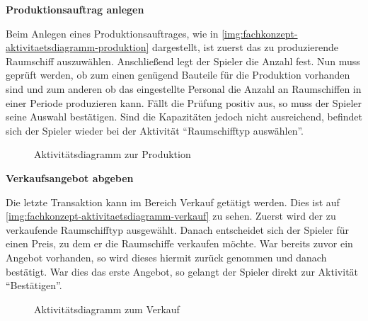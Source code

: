 \medskip

\textbf{Produktionsauftrag anlegen}

Beim Anlegen eines Produktionsauftrages, wie in \vref{img:fachkonzept-aktivitaetsdiagramm-produktion} dargestellt, ist zuerst das zu produzierende Raumschiff auszuwählen. Anschließend legt der Spieler die Anzahl fest. Nun muss geprüft werden, ob zum einen genügend Bauteile für die Produktion vorhanden sind und zum anderen ob das eingestellte Personal die Anzahl an Raumschiffen in einer Periode produzieren kann. Fällt die Prüfung positiv aus, so muss der Spieler seine Auswahl bestätigen. Sind die Kapazitäten jedoch nicht ausreichend, befindet sich der Spieler wieder bei der Aktivität “Raumschifftyp auswählen”.

\begin{figure}[htb]
  \centering
  \caption{Aktivitätsdiagramm zur Produktion}
  \label{img:fachkonzept-aktivitaetsdiagramm-produktion}
\end{figure}

\medskip

\textbf{Verkaufsangebot abgeben}

Die letzte Transaktion kann im Bereich Verkauf getätigt werden. Dies ist auf \vref{img:fachkonzept-aktivitaetsdiagramm-verkauf} zu sehen. Zuerst wird der zu verkaufende Raumschifftyp ausgewählt. Danach entscheidet sich der Spieler für einen Preis, zu dem er die Raumschiffe verkaufen möchte. War bereits zuvor ein Angebot vorhanden, so wird dieses hiermit zurück genommen und danach bestätigt. War dies das erste Angebot, so gelangt der Spieler direkt zur Aktivität “Bestätigen”.

\begin{figure}[htb]
  \centering
  \caption{Aktivitätsdiagramm zum Verkauf}
  \label{img:fachkonzept-aktivitaetsdiagramm-verkauf}
\end{figure}

\autorende{}